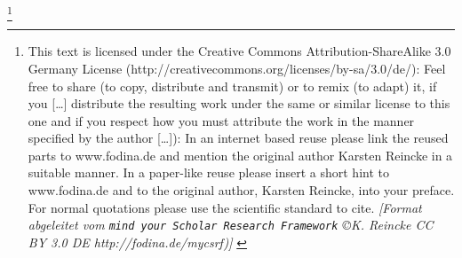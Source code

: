 %
%
%
%

\footnote{This text is licensed under the Creative
Commons Attribution-ShareAlike 3.0 Germany License
(http://creativecommons.org/licenses/by-sa/3.0/de/): Feel free \glqq{}to share
(to copy, distribute and transmit)\grqq{} or \glqq{}to remix (to adapt)\grqq{}
it, if you \glqq{}[\ldots] distribute the resulting work under the same or
similar license to this one\grqq{} and if you respect how \glqq{}you must
attribute the work in the manner specified by the author [\ldots]\grqq{}):
\newline
In an internet based reuse please link the reused parts to www.fodina.de and
mention the original author Karsten Reincke in a suitable manner. In a
paper-like reuse please insert a short hint to www.fodina.de and to the original
author, Karsten Reincke, into your preface. For normal quotations please use the
scientific standard to cite.
\newline
{ \tiny \itshape [Format abgeleitet vom \texttt{mind your Scholar Research
Framework} \copyright K. Reincke CC BY 3.0 DE http://fodina.de/mycsrf)] }}
